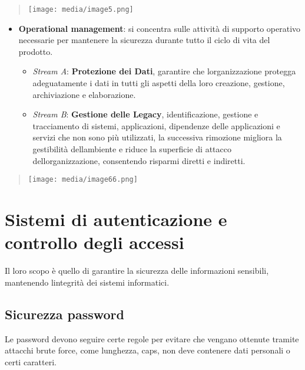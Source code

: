 \begin{quote}
\texttt{[image: media/image5.png]}
\end{quote}

\begin{itemize}
\item
  \textbf{Operational management}: si concentra sulle attività di
  supporto operativo necessarie per mantenere la sicurezza durante tutto
  il ciclo di vita del prodotto.

  \begin{itemize}
  \item
    \emph{Stream A}: \textbf{Protezione dei Dati}, garantire che
    l\textquotesingle organizzazione protegga adeguatamente i dati in
    tutti gli aspetti della loro creazione, gestione, archiviazione e
    elaborazione.
  \item
    \emph{Stream B}: \textbf{Gestione delle Legacy}, identificazione,
    gestione e tracciamento di sistemi, applicazioni, dipendenze delle
    applicazioni e servizi che non sono più utilizzati, la successiva
    rimozione migliora la gestibilità dell\textquotesingle ambiente e
    riduce la superficie di attacco dell\textquotesingle organizzazione,
    consentendo risparmi diretti e indiretti.
  \end{itemize}
\end{itemize}

\begin{quote}
\texttt{[image: media/image66.png]}
\end{quote}

\section{Sistemi di autenticazione e controllo degli
accessi}\label{sistemi-di-autenticazione-e-controllo-degli-accessi}

Il loro scopo è quello di garantire la sicurezza delle informazioni
sensibili, mantenendo l\textquotesingle integrità dei sistemi
informatici.

\subsection{Sicurezza password}\label{sicurezza-password}

Le password devono seguire certe regole per evitare che vengano ottenute
tramite attacchi brute force, come lunghezza, caps, non deve contenere
dati personali o certi caratteri.

